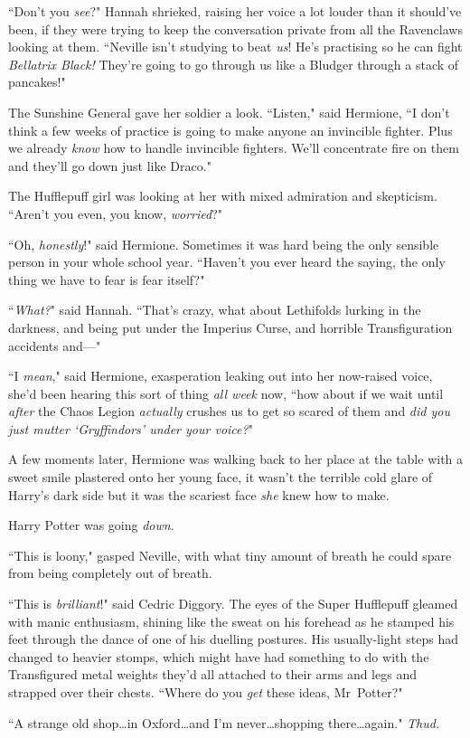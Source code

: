 ``Don't you \emph{see}?" Hannah shrieked, raising her voice a lot louder than it should've been, if they were trying to keep the conversation private from all the Ravenclaws looking at them. ``Neville isn't studying to beat \emph{us}! He's practising so he can fight \emph{Bellatrix Black!} They're going to go through us like a Bludger through a stack of pancakes!"

The Sunshine General gave her soldier a look. ``Listen," said Hermione, ``I don't think a few weeks of practice is going to make anyone an invincible fighter. Plus we already \emph{know} how to handle invincible fighters. We'll concentrate fire on them and they'll go down just like Draco."

The Hufflepuff girl was looking at her with mixed admiration and skepticism. ``Aren't you even, you know, \emph{worried}?"

``Oh, \emph{honestly}!" said Hermione. Sometimes it was hard being the only sensible person in your whole school year. ``Haven't you ever heard the saying, the only thing we have to fear is fear itself?"

``\emph{What?}" said Hannah. ``That's crazy, what about Lethifolds lurking in the darkness, and being put under the Imperius Curse, and horrible Transfiguration accidents and—"

``I \emph{mean}," said Hermione, exasperation leaking out into her now-raised voice, she'd been hearing this sort of thing \emph{all week} now, ``how about if we wait until \emph{after} the Chaos Legion \emph{actually} crushes us to get so scared of them and \emph{did you just mutter `Gryffindors' under your voice?}"

A few moments later, Hermione was walking back to her place at the table with a sweet smile plastered onto her young face, it wasn't the terrible cold glare of Harry's dark side but it was the scariest face \emph{she} knew how to make.

Harry Potter was going \emph{down}.

\later

``This is loony," gasped Neville, with what tiny amount of breath he could spare from being completely out of breath.

``This is \emph{brilliant}!" said Cedric Diggory. The eyes of the Super Hufflepuff gleamed with manic enthusiasm, shining like the sweat on his forehead as he stamped his feet through the dance of one of his duelling postures. His usually-light steps had changed to heavier stomps, which might have had something to do with the Transfigured metal weights they'd all attached to their arms and legs and strapped over their chests. ``Where do you \emph{get} these ideas, Mr~Potter?"

``A strange old shop…in Oxford…and I'm never…shopping there…again." \emph{Thud.}

